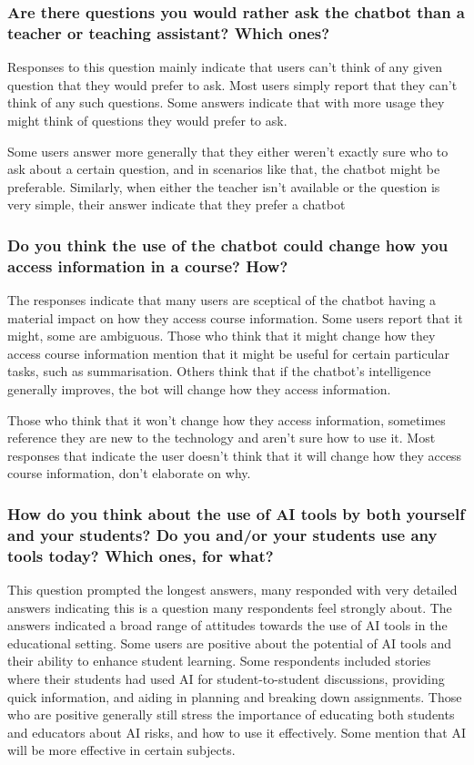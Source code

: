 \subsubsection{Are there questions you would rather ask the chatbot than a teacher or teaching assistant? Which ones?}


Responses to this question mainly indicate that users can’t think of any given question that they would prefer to ask. Most users simply report that they can’t think of any such questions. Some answers indicate that with more usage they might think of questions they would prefer to ask.


Some users answer more generally that they either weren't exactly sure who to ask about a certain question, and in scenarios like that, the chatbot might be preferable. Similarly, when either the teacher isn’t available or the question is very simple, their answer indicate that they prefer a chatbot


\subsubsection{Do you think the use of the chatbot could change how you access information in a course? How?}


The responses indicate that many users are sceptical of the chatbot having a material impact on how they access course information. Some users report that it might, some are ambiguous. Those who think that it might change how they access course information mention that it might be useful for certain particular tasks, such as summarisation. Others think that if the chatbot’s intelligence generally improves, the bot will change how they access information.


Those who think that it won’t change how they access information, sometimes reference they are new to the technology and aren’t sure how to use it. Most responses that indicate the user doesn’t think that it will change how they access course information, don't elaborate on why.




\subsubsection{How do you think about the use of AI tools by both yourself and your students? Do you and/or your students use any tools today? Which ones, for what?}


This question prompted the longest answers, many responded with very detailed answers indicating this is a question many respondents feel strongly about. The answers indicated a broad range of attitudes towards the use of AI tools in the educational setting. Some users are positive about the potential of AI tools and their ability to enhance student learning. Some respondents included stories where their students had used AI for student-to-student discussions, providing quick information, and aiding in planning and breaking down assignments. Those who are positive generally still stress the importance of educating both students and educators about AI risks, and how to use it effectively. Some mention that AI will be more effective in certain subjects.


